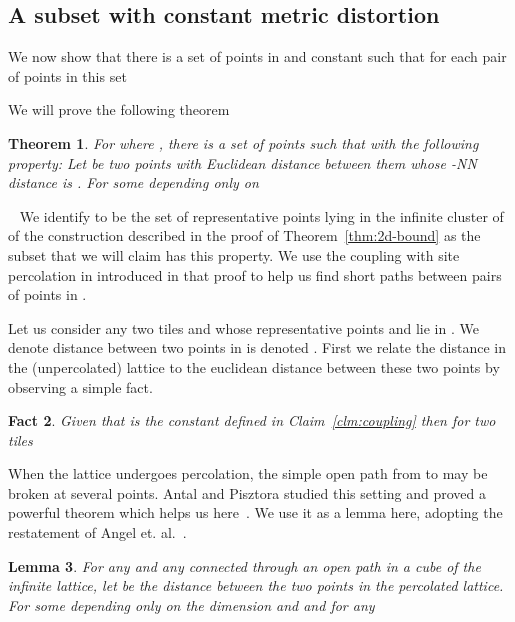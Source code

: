 \documentclass[11pt]{article}
\newtheorem{theorem}{Theorem}[section]
\newtheorem{lemma}[theorem]{Lemma}
\newtheorem{fact}[theorem]{Fact}
\newcommand{\sq}{\hbox{\rlap{}}}
\newcommand{\qed}{\hspace*{\fill}\sq}
\newenvironment{proof}{\noindent {\bf Proof.}\ }{\qed\par\vskip 4mm\par}
\begin{document}
\subsection{A subset with constant metric distortion}
\label{sec:metric:subset}

We now show that there is a set of points in  and constant
 such that for each pair of points  in this set

We will prove the following theorem
\begin{theorem}
\label{thm:metric}
For  where , there is a set of points  such that  with the following
property: Let  be two points with Euclidean distance
 between them whose -NN distance is . For some
 depending only on 

\end{theorem}
\begin{proof}
We identify  to be the set of representative points lying in the
infinite cluster of  of the construction described in the
proof of Theorem~\ref{thm:2d-bound} as the subset that we will claim
has this property. We use the coupling with site percolation in
 introduced in that proof to help us find short paths between
pairs of points in . 

Let us consider any two tiles  and  whose representative
points  and  lie in . We denote
distance between two points  in  is denoted
. First we relate the distance in the (unpercolated)
lattice to the euclidean distance between these two points by
observing a simple fact.
\begin{fact}
\label{fct:euclidean-lattice}
Given that  is the constant defined in
Claim~\ref{clm:coupling} then for two tiles 

\end{fact}

When the lattice undergoes percolation, the simple open path from
 to  may be broken at several
points. Antal and Pisztora studied this setting and proved a powerful
theorem which helps us here~\cite[Theorems 1.1 and
1.2]{antal-ap:1996}. We use it as a lemma here, adopting the
restatement of Angel et. al.~\cite[Lemma 8]{angel-podc:2005}.
\begin{lemma}
\label{lem:antal}
{\bf \cite{antal-ap:1996,angel-podc:2005}} For any  and any
   connected through an open path in a cube  of the infinite
  lattice, let  be the distance between the two
  points in the percolated lattice. For some  depending
  only on the dimension and  and for any 

\end{lemma}


\end{proof}
\end{document}
